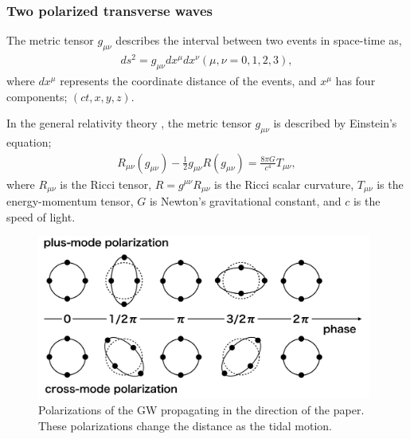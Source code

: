 \subsubsection{Two polarized transverse waves}
The metric tensor $g_{\mu\nu}$ describes the interval between two events in space-time as, 
\begin{eqnarray}
  d s^{2}=g_{\mu \nu} d x^{\mu} d x^{\nu} (\mu,\nu = 0,1,2,3),
\end{eqnarray}
where $dx^{\mu}$ represents the coordinate distance of the events, and $x^{\mu}$ has four components; $(ct,x,y,z)$.

In the general relativity theory \cite{einstein1916vd}, the metric tensor $g_{\mu\nu}$ is described by Einstein's equation;
\begin{eqnarray}
  R_{\mu \nu}\left(g_{\mu \nu}\right)-\frac{1}{2} g_{\mu \nu} R\left(g_{\mu \nu}\right)=\frac{8 \pi G}{c^{4}} T_{\mu \nu},
\end{eqnarray}
where $R_{\mu\nu}$ is the Ricci tensor, $R=g^{\mu \nu} R_{\mu \nu}$ is the Ricci scalar curvature, $T_{\mu\nu}$ is the energy-momentum tensor, $G$ is Newton's gravitational constant, and $c$ is the speed of light.

\begin{figure}[t]
  \begin{center}   
    \includegraphics[width=11.0cm]{./img_chap1/img131.png}
    \caption{Polarizations of the GW propagating in the direction of the paper. These polarizations change the distance as the tidal motion. }\label{img:img131}
  \end{center}
\end{figure}

